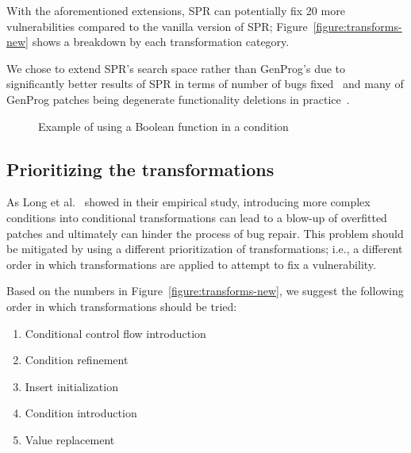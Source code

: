 With the aforementioned extensions, SPR can potentially fix 20 more vulnerabilities compared to the vanilla version of SPR; Figure~\ref{figure:transforms-new} shows a breakdown by each transformation category.

We chose to extend SPR's search space rather than GenProg's due to significantly better results of SPR in terms of number of bugs fixed~\cite{long2015staged} and many of GenProg patches being degenerate functionality deletions in practice~\cite{qi2015analysis}.

\begin{figure}



\vspace{0.1in}
\small \caption{Example of using a Boolean function in a condition}
    \label{figure:new-ccfi}
\vspace{-0.2in}
\end{figure}

\subsection{Prioritizing the transformations}

As Long et al.~\cite{long2016analysis} showed in their empirical study, introducing more complex conditions into conditional transformations can lead to a blow-up of overfitted patches and ultimately can hinder the process of bug repair. This problem should be mitigated by using a different prioritization of transformations; i.e., a different order in which transformations are applied to attempt to fix a vulnerability.

Based on the numbers in Figure~\ref{figure:transforms-new}, we suggest the following order in which transformations should be tried:
\begin{enumerate}
    \item Conditional control flow introduction
    \item Condition refinement
    \item Insert initialization
    \item Condition introduction
    \item Value replacement
\end{enumerate}
